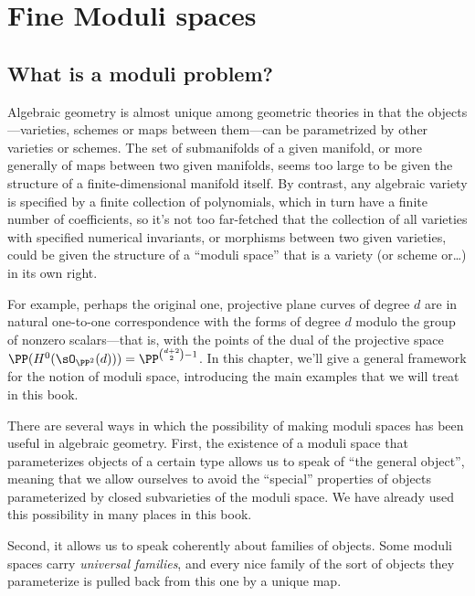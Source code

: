 

\chapter{Fine Moduli spaces} 
\label{Moduli chapter}\label{ModuliChapter}

\section{What is a moduli problem?}

Algebraic geometry is almost unique among geometric theories in that the objects---varieties,  schemes or maps between them---can be parametrized by other varieties or schemes. The set of submanifolds of a given manifold, or more generally of maps between two given manifolds, seems too large to be given the structure of a finite-dimensional manifold itself. By contrast, any algebraic variety is specified by a finite collection of polynomials, which in turn have a finite number of coefficients, so it's not too far-fetched that the collection of all varieties with specified numerical invariants, or morphisms between two given varieties, could be given the structure of a ``moduli space'' that is a variety (or scheme or\dots) in its own right.

For example, perhaps the original one, projective plane curves of degree $d$
are in natural one-to-one correspondence with the forms of degree $d$ modulo the group of nonzero scalars---that is, with the points of the dual of the projective space
$ \PP(H^0(\sO_{\PP^2}(d)))=\PP^{\binom{d+2}{2}-1} $.
In this chapter, we'll give a general framework for the notion of moduli space, introducing the main examples that we will treat in this book.

There are several ways in which the possibility of making moduli spaces has been useful in algebraic geometry. First, the existence of a moduli space that  parameterizes objects of a certain type allows us to speak of ``the general object'', meaning that we allow ourselves to avoid the ``special'' properties of objects parameterized by closed subvarieties of the moduli space. We have already used this
possibility in many places in this book. 

Second, it allows us to speak coherently about
families of objects. Some moduli spaces carry \emph{universal families}, and every nice family of the sort of objects
they parameterize is pulled back from this one by a unique map.  

